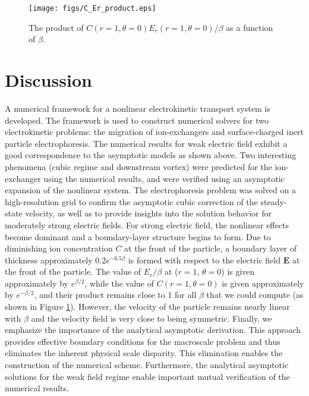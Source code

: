 \documentclass[MSc,beforeExam]{iitcsthesis}
\newcommand\bE{\boldsymbol{E}}
\begin{document}
\begin{figure}
    \begin{center}
    \texttt{[image: figs/C\_Er\_product.eps]}
        \caption{The product of $C(r=1, \theta=0) E_r(r=1, \theta=0) / \beta$ as
        a function of $\beta$.}
	    \label{fig:C_Er_product}	    
    \end{center}
\end{figure}


\section{Discussion} \label{sec:discussion}
A numerical framework for a
nonlinear electrokinetic transport system is developed.
The framework is used to construct numerical solvers 
for two electrokinetic problems: the migration of ion-exchangers
and surface-charged inert particle electrophoresis.
The numerical results for weak electric field 
exhibit a good correspondence to the asymptotic models as shown above.
Two interesting phenomena (cubic regime and downstream vortex) were predicted for the ion-exchanger
using the numerical results, and were verified using an asymptotic expansion of the nonlinear system.
The electrophoresis problem was solved on a high-resolution grid to confirm the asymptotic 
cubic correction of the steady-state velocity, as well as to provide insights into
the solution behavior for moderately strong electric fields.
For strong electric field, the nonlinear effects become dominant and
a boundary-layer structure begins to form.
Due to diminishing ion concentration $C$ at the front of the particle,
a boundary layer of thickness approximately $0.2 e^{-0.5\beta}$ 
is formed with respect to the electric field $\bE$ at the front of the particle.
The value of $E_r / \beta$ at ($r = 1$, $\theta = 0$) is given approximately by 
$e^{\beta/2}$, while the value of $C(r = 1, \theta = 0)$ is given approximately 
by $e^{-\beta/2}$, and their product remains close to 1 for all $\beta$ that we could compute
(as shown in Figure \ref{fig:C_Er_product}).
However, the velocity of the particle remains nearly linear with $\beta$
and the velocity field is very close to being symmetric.
Finally, we emphasize the importance of the analytical asymptotic derivation. This approach provides effective boundary conditions for the macroscale problem and thus eliminates the inherent physical scale disparity. This elimination enables the construction of the numerical scheme.
Furthermore, the analytical asymptotic solutions for the weak field regime enable important mutual verification of the numerical results.
\end{document}

